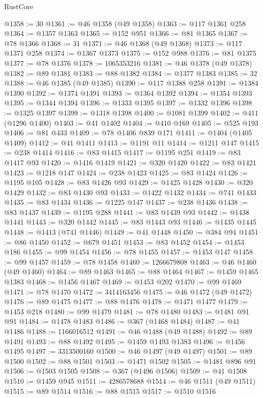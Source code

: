 \begin{lexlean}{RustCore}
\begin{coremodule}
@1358 := 30
@1361 := @46 @1358 (@49 @1358)
@1363 := @117 @1361 @258
@1364 := @1357 @1363
@1365 := @152 @951
@1366 := @81 @1365
@1367 := @78 @1366
@1368 := 31
@1371 := @46 @1368 (@49 @1368)
@1373 := @117 @1371 @258
@1374 := @1367 @1373
@1375 := @152 @988
@1376 := @81 @1375
@1377 := @78 @1376
@1378 := 1065353216
@1381 := @46 @1378 (@49 @1378)
@1382 := @89 @1381
@1383 := @88 @1382
@1384 := @1377 @1383
@1385 := 32
@1388 := @46 @1385 (@49 @1385)
@1390 := @117 @1388 @258
@1391 := @1384 @1390
@1392 := @1374 @1391
@1393 := @1364 @1392
@1394 := @1354 @1393
@1395 := @1344 @1394
@1396 := @1333 @1395
@1397 := @1332 @1396
@1398 := @1325 @1397
@1399 := @1318 @1398
@1400 := @1081 @1399
@1402 := @411 (@1296 @1400)
@1403 := @41 @1402
@1404 := @410 @169
@1405 := @525 @193
@1406 := @81 @433
@1409 := @78 @1406 @839 @171
@1411 := @1404 (@1405 @1409)
@1412 := @41 @1411
@1413 := @1191 @11
@1414 := @1211 @147
@1415 := @238 @1414
@1416 := @83 @1415
@1417 := @1195 @251
@1419 := @83 @1417 @93
@1420 := @1416 @1419
@1421 := @320 @1420
@1422 := @83 @1421
@1423 := @1218 @147
@1424 := @238 @1423
@1425 := @83 @1424
@1426 := @1195 @105
@1428 := @83 @1426 @93
@1429 := @1425 @1428
@1430 := @320 @1429
@1432 := @83 @1430 @93
@1433 := @1422 @1432
@1434 := @741 @1433
@1435 := @83 @1434
@1436 := @1225 @147
@1437 := @238 @1436
@1438 := @83 @1437
@1439 := @1195 @288
@1441 := @83 @1439 @93
@1442 := @1438 @1441
@1443 := @320 @1442
@1445 := @83 @1443 @93
@1446 := @1435 @1445
@1448 := @1413 (@741 @1446)
@1449 := @41 @1448
@1450 := @384 @94
@1451 := @86 @1450
@1452 := @679 @1451
@1453 := @83 @1452
@1454 := @1453 @186
@1455 := @99 @1454
@1456 := @78 @1455
@1457 := @1453 @147
@1458 := @99 @1457
@1459 := @78 @1458
@1460 := 1266679808
@1463 := @46 @1460 (@49 @1460)
@1464 := @89 @1463
@1465 := @88 @1464
@1467 := @1459 @1465 @1383
@1468 := @1456 @1467
@1469 := @1453 @202
@1470 := @99 @1469
@1471 := @78 @1470
@1472 := 3414163456
@1475 := @46 @1472 (@49 @1472)
@1476 := @89 @1475
@1477 := @88 @1476
@1478 := @1471 @1477
@1479 := @1453 @218
@1480 := @99 @1479
@1481 := @78 @1480
@1483 := @1481 @91 @91
@1484 := @1478 @1483
@1486 := @367 (@1468 @1484)
@1487 := @41 @1486
@1488 := 1166016512
@1491 := @46 @1488 (@49 @1488)
@1492 := @89 @1491
@1493 := @88 @1492
@1495 := @1459 @1493 @1383
@1496 := @1456 @1495
@1497 := 3313500160
@1500 := @46 @1497 (@49 @1497)
@1501 := @89 @1500
@1502 := @88 @1501
@1503 := @1471 @1502
@1505 := @1481 @896 @91
@1506 := @1503 @1505
@1508 := @367 (@1496 @1506)
@1509 := @41 @1508
@1510 := @1459 @945
@1511 := 4286578688
@1514 := @46 @1511 (@49 @1511)
@1515 := @89 @1514
@1516 := @88 @1515
@1517 := @1510 @1516

\end{coremodule}
\end{lexlean}
